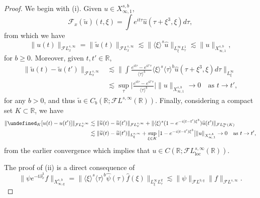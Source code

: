 \documentclass[%
11pt,  reqno]{amsart}
\newcommand{\jap}[1]{\langle #1 \rangle}
\newcommand{\5}{\textup{V}}
\newcommand{\FL}{\mathcal{F} L}
\newcommand{\ft}{\widehat}
\newcommand{\les}{\lesssim}
\newcommand{\wt}{\widetilde}
\theoremstyle{remark}
\newcommand{\R}{\mathbb{R}}
\let\P= \undefined
\newcommand{\P}{\mathbf{P}}
\newcommand{\Ft}{{\mathcal{F}}}
\newcommand{\jb}[1]
{\langle #1 \rangle}
\numberwithin{equation}{section}
\numberwithin{theorem}{section}
\begin{document}
		\begin{proof}
			
			We begin with (i). Given $u\in X^{s,b}_{\infty,1}$,
			$$
            \Ft_x(\wt u)(t,\xi) = \int e^{it\tau}\ft{u}(\tau+\xi^3,\xi)d\tau, 
			$$ 
            from which we have
$$\| u(t)\|_{\FL^{s,\infty}_x} = \|\wt{u}(t)\|_{\FL^{s,\infty}_x} \lesssim \|\jap{\xi}^s\ft {u}\|_{L^\infty_\xi L^1_\tau} \les \|u\|_{X^{s,b}_{\infty,1}}, 
			$$
            for $b\ge 0$. 
			Moreover, given $t,t'\in\R$,
			\begin{align*}
				\|\wt{u}(t)-\wt{u}(t')\|_{\FL_x^{s,\infty}} &\lesssim \bigg\|\int \frac{e^{it\tau}-e^{it'\tau}}{\jap{\tau}^b}\jap{\xi}^s\jap{\tau}^b\ft{u}(\tau+\xi^3,\xi)d\tau\bigg\|_{L^\infty_\xi}\\&\lesssim \sup_{\tau} \bigg| \frac{e^{it\tau}-e^{it'\tau}}{\jap{\tau}^b}\bigg| \|u\|_{X^{s,b}_{\infty,1}} \to 0 \quad \mbox{as }t\to t',
			\end{align*}
            for any $b>0$, 
			and thus $\wt{u}\in C_b(\R;\FL^{s,\infty}(\R))$. Finally, considering a compact set $K\subset \R$, we have
			\begin{align*}
				\| \P_K [u(t)-u(t')]\|_{\mathcal{F}L^{s,\infty}_x} 
                &
                \lesssim \|\wt{u}(t)-\wt{u}(t')\|_{\FL^{s,\infty}_x} 
                + \|\jb{\xi}^s (1-e^{-i(t-t')\xi^3})\ft{u}(t')\|_{\FL^{\infty}_x (K) } \\&\lesssim \|\wt{u}(t)-\wt{u}(t')\|_{L^{s,\infty}_\xi} + \sup_{\xi\in K}\big|1 -e^{-i (t-t')\xi^3}\big| \| u \|_{X^{s,b}_{\infty,1}} \to 0\quad \mbox{as }t\to t', 
			\end{align*}
            from the earlier convergence 
			which implies that $u\in C(\R;\mathcal{F}L^{s,\infty}_{\mathrm{loc}}(\R))$. 


            The proof of (ii) is a direct consequence of
			$$
			\|\psi e^{-t\partial_x^3}f\|_{X^{s,b}_{\infty,q}} = \|\jap{\xi}^s\jap{\tau}^b\ft{\psi}(\tau)\ft{f}(\xi)\|_{L^\infty_\xi L^q_\tau} \lesssim \|\psi\|_{\FL^{b,q}} \|f\|_{\FL^{s,\infty}}.
			$$

            
            
            
			\smallskip
			

\end{proof}
\end{document}
